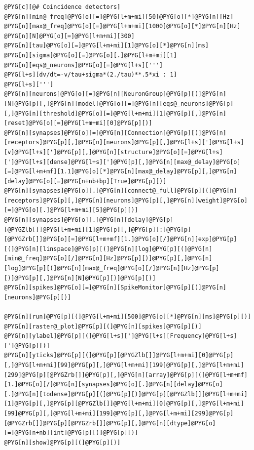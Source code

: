 \documentclass[letterpaper,10pt,english]{manual}
\begin{document}
\begin{Verbatim}[commandchars=@\[\]]
@PYG[c][@# Coincidence detectors]
@PYG[n][min@_freq]@PYG[o][=]@PYG[l+m+mi][50]@PYG[o][*]@PYG[n][Hz]
@PYG[n][max@_freq]@PYG[o][=]@PYG[l+m+mi][1000]@PYG[o][*]@PYG[n][Hz]
@PYG[n][N]@PYG[o][=]@PYG[l+m+mi][300]
@PYG[n][tau]@PYG[o][=]@PYG[l+m+mi][1]@PYG[o][*]@PYG[n][ms]
@PYG[n][sigma]@PYG[o][=]@PYG[o][.]@PYG[l+m+mi][1]
@PYG[n][eqs@_neurons]@PYG[o][=]@PYG[l+s][''']
@PYG[l+s][dv/dt=-v/tau+sigma*(2./tau)**.5*xi : 1]
@PYG[l+s][''']
@PYG[n][neurons]@PYG[o][=]@PYG[n][NeuronGroup]@PYG[p][(]@PYG[n][N]@PYG[p][,]@PYG[n][model]@PYG[o][=]@PYG[n][eqs@_neurons]@PYG[p][,]@PYG[n][threshold]@PYG[o][=]@PYG[l+m+mi][1]@PYG[p][,]@PYG[n][reset]@PYG[o][=]@PYG[l+m+mi][0]@PYG[p][)]
@PYG[n][synapses]@PYG[o][=]@PYG[n][Connection]@PYG[p][(]@PYG[n][receptors]@PYG[p][,]@PYG[n][neurons]@PYG[p][,]@PYG[l+s][']@PYG[l+s][v]@PYG[l+s][']@PYG[p][,]@PYG[n][structure]@PYG[o][=]@PYG[l+s][']@PYG[l+s][dense]@PYG[l+s][']@PYG[p][,]@PYG[n][max@_delay]@PYG[o][=]@PYG[l+m+mf][1.1]@PYG[o][*]@PYG[n][max@_delay]@PYG[p][,]@PYG[n][delay]@PYG[o][=]@PYG[n+nb+bp][True]@PYG[p][)]
@PYG[n][synapses]@PYG[o][.]@PYG[n][connect@_full]@PYG[p][(]@PYG[n][receptors]@PYG[p][,]@PYG[n][neurons]@PYG[p][,]@PYG[n][weight]@PYG[o][=]@PYG[o][.]@PYG[l+m+mi][5]@PYG[p][)]
@PYG[n][synapses]@PYG[o][.]@PYG[n][delay]@PYG[p][@PYGZlb[]]@PYG[l+m+mi][1]@PYG[p][,]@PYG[p][:]@PYG[p][@PYGZrb[]]@PYG[o][=]@PYG[l+m+mf][1.]@PYG[o][/]@PYG[n][exp]@PYG[p][(]@PYG[n][linspace]@PYG[p][(]@PYG[n][log]@PYG[p][(]@PYG[n][min@_freq]@PYG[o][/]@PYG[n][Hz]@PYG[p][)]@PYG[p][,]@PYG[n][log]@PYG[p][(]@PYG[n][max@_freq]@PYG[o][/]@PYG[n][Hz]@PYG[p][)]@PYG[p][,]@PYG[n][N]@PYG[p][)]@PYG[p][)]
@PYG[n][spikes]@PYG[o][=]@PYG[n][SpikeMonitor]@PYG[p][(]@PYG[n][neurons]@PYG[p][)]

@PYG[n][run]@PYG[p][(]@PYG[l+m+mi][500]@PYG[o][*]@PYG[n][ms]@PYG[p][)]
@PYG[n][raster@_plot]@PYG[p][(]@PYG[n][spikes]@PYG[p][)]
@PYG[n][ylabel]@PYG[p][(]@PYG[l+s][']@PYG[l+s][Frequency]@PYG[l+s][']@PYG[p][)]
@PYG[n][yticks]@PYG[p][(]@PYG[p][@PYGZlb[]]@PYG[l+m+mi][0]@PYG[p][,]@PYG[l+m+mi][99]@PYG[p][,]@PYG[l+m+mi][199]@PYG[p][,]@PYG[l+m+mi][299]@PYG[p][@PYGZrb[]]@PYG[p][,]@PYG[n][array]@PYG[p][(]@PYG[l+m+mf][1.]@PYG[o][/]@PYG[n][synapses]@PYG[o][.]@PYG[n][delay]@PYG[o][.]@PYG[n][todense]@PYG[p][(]@PYG[p][)]@PYG[p][@PYGZlb[]]@PYG[l+m+mi][1]@PYG[p][,]@PYG[p][@PYGZlb[]]@PYG[l+m+mi][0]@PYG[p][,]@PYG[l+m+mi][99]@PYG[p][,]@PYG[l+m+mi][199]@PYG[p][,]@PYG[l+m+mi][299]@PYG[p][@PYGZrb[]]@PYG[p][@PYGZrb[]]@PYG[p][,]@PYG[n][dtype]@PYG[o][=]@PYG[n+nb][int]@PYG[p][)]@PYG[p][)]
@PYG[n][show]@PYG[p][(]@PYG[p][)]
\end{Verbatim}
\end{document}
